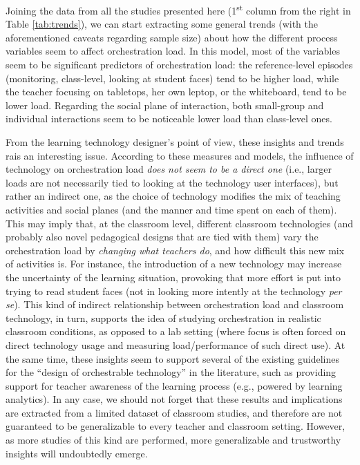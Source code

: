 \documentclass[10pt,journal,compsoc]{IEEEtran}
\begin{document}
Joining the data from all the studies presented here (1\textsuperscript{st} column from the right in Table \ref{tab:trends}), we can start extracting some general trends (with the aforementioned caveats regarding sample size) about how the different process variables seem to affect orchestration load. In this model, most of the variables seem to be significant predictors of orchestration load: the reference-level episodes (monitoring, class-level, looking at student faces) tend to be higher load, while the teacher focusing on tabletops, her own leptop, or the whiteboard, tend to be lower load. Regarding the social plane of interaction, both small-group and individual interactions seem to be noticeable lower load than class-level ones.

From the learning technology designer's point of view, these insights and trends rais an interesting issue. According to these measures and models, the influence of technology on orchestration load \textit{does not seem to be a direct one} (i.e., larger loads are not necessarily tied to looking at the technology user interfaces), but rather an indirect one, as the choice of technology modifies the mix of teaching activities and social planes (and the manner and time spent on each of them). This may imply that, at the classroom level, different classroom technologies (and probably also novel pedagogical designs that are tied with them) vary the orchestration load by \textit{changing what teachers do}, and how difficult this new mix of activities is. For instance, the introduction of a new technology may increase the uncertainty of the learning situation, provoking that more effort is put into trying to read student faces (not in looking more intently at the technology \textit{per se}). This kind of indirect relationship between orchestration load and classroom technology, in turn, supports the idea of studying orchestration in realistic classroom conditions, as opposed to a lab setting (where focus is often forced on direct technology usage and measuring load/performance of such direct use). At the same time, these insights seem to support several of the existing guidelines for the ``design of orchestrable technology'' in the literature, such as providing support for teacher awareness of the learning process \cite{dillenbourg2013design} (e.g., powered by learning analytics). In any case, we should not forget that these results and implications are extracted from a limited dataset of classroom studies, and therefore are not guaranteed to be generalizable to every teacher and classroom setting. However, as more studies of this kind are performed, more generalizable and trustworthy insights will undoubtedly emerge.
\end{document}
